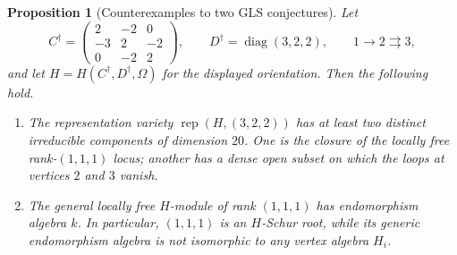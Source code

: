 \documentclass[11pt, reqno]{amsart}
\numberwithin{equation}{section}
\newtheorem{proposition}[theorem]{Proposition}
\theoremstyle{definition}
\theoremstyle{remark}
\newcommand{\op}[1]{\operatorname{#1}}
\newcommand{\Rep}{\op{rep}}
\begin{document}
\begin{proposition}[{Counterexamples to two GLS conjectures}]
\label{prop:gls-counterexamples}\label{ex:gls-counterexamples}
Let
\[
 C^\dagger=\begin{pmatrix}2&-2&0\\-3&2&-2\\0&-2&2\end{pmatrix},
 \qquad D^\dagger=\op{diag}(3,2,2),
 \qquad 1\longrightarrow2\rightrightarrows3,
\]
and let $H=H(C^\dagger,D^\dagger,\Omega)$ for the displayed
orientation. Then the following hold.
\begin{enumerate}
\item The representation variety $\Rep(H,(3,2,2))$ has at least two
distinct irreducible components of dimension $20$. One is the
closure of the locally free rank-$(1,1,1)$ locus; another has a
dense open subset on which the loops at vertices $2$ and $3$
vanish.
\item The general locally free $H$-module of rank $(1,1,1)$ has
endomorphism algebra $k$. In particular, $(1,1,1)$ is an
$H$-Schur root, while its generic endomorphism algebra is not
isomorphic to any vertex algebra $H_i$.
\end{enumerate}
\end{proposition}
\end{document}
